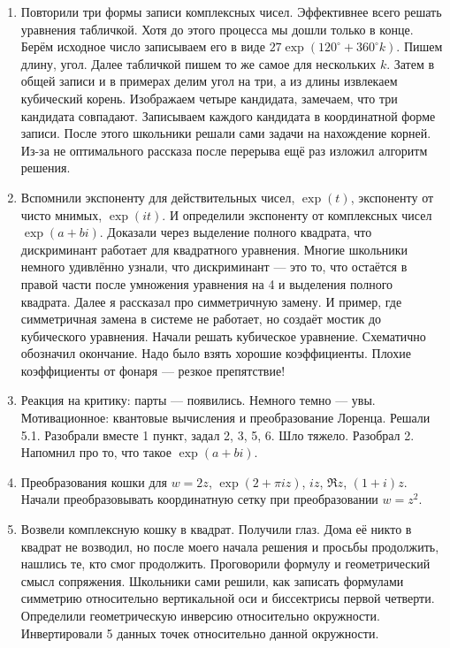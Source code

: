 \documentclass[12pt]{article}
\theoremstyle{definition}
\begin{document}
\begin{enumerate}
  \item Повторили три формы записи комплексных чисел. Эффективнее всего решать уравнения табличкой. Хотя до этого процесса мы 
  дошли только в конце. 
  Берём исходное число записываем его в виде $27 \exp(120^{\circ} + 360^{\circ}k)$. Пишем длину, угол. 
  Далее табличкой пишем то же самое для нескольких $k$. Затем в общей записи и в примерах делим угол на три, а из длины извлекаем 
  кубический корень. Изображаем четыре кандидата, замечаем, что три кандидата совпадают. Записываем каждого кандидата в координатной форме записи.
  После этого школьники решали сами задачи на нахождение корней. Из-за не оптимального рассказа после перерыва ещё раз изложил алгоритм решения. 
  \item Вспомнили экспоненту для действительных чисел, $\exp(t)$, экспоненту от чисто мнимых, $\exp(it)$. 
  И определили экспоненту от комплексных чисел $\exp(a + bi)$. Доказали через выделение полного квадрата, что дискриминант работает 
  для квадратного уравнения. Многие школьники немного удивлённо узнали, 
  что дискриминант — это то, что остаётся в правой части после умножения уравнения на 4 и выделения полного квадрата. 
  Далее я рассказал про симметричную замену. И пример, где симметричная замена в системе не работает, но создаёт мостик до кубического уравнения. 
  Начали решать кубическое уравнение. Схематично обозначил окончание. Надо было взять хорошие коэффициенты. Плохие коэффициенты от фонаря — резкое препятствие!
  \item   Реакция на критику: парты — появились. Немного темно — увы. Мотивационное: квантовые вычисления и преобразование Лоренца. 
  Решали 5.1. Разобрали вместе 1 пункт, задал 2, 3, 5, 6. Шло тяжело. Разобрал 2. Напомнил про то, что такое $\exp(a + bi)$.
  \item Преобразования кошки для $w=2z$, $\exp(2+\pi i z)$, $iz$, $\Re z$, $(1+i) z$. Начали преобразовывать координатную сетку при преобразовании $w=z^2$.
  \item Возвели комплексную кошку в квадрат. Получили глаз. Дома её никто в квадрат не возводил, но после моего начала решения и просьбы продолжить,
  нашлись те, кто смог продолжить. Проговорили формулу и геометрический смысл сопряжения. Школьники сами решили, как записать 
  формулами симметрию относительно вертикальной оси и биссектрисы первой четверти. 
  Определили геометрическую инверсию относительно окружности. Инвертировали 5 данных точек относительно данной окружности. 



\end{enumerate}
\end{document}
